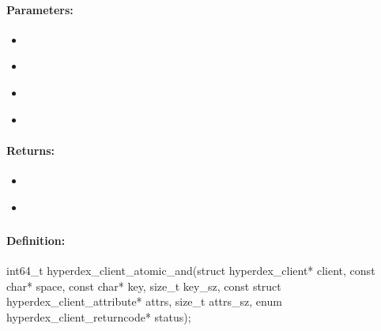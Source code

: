 \paragraph{Parameters:}
\begin{itemize}[noitemsep]
\item {}\\

\item {}\\

\item {}\\

\item {}\\

\end{itemize}

\paragraph{Returns:}
\begin{itemize}[noitemsep]
\item {}\\

\item {}\\

\end{itemize}

\pagebreak
\subsubsection{}
\label{api:c:atomic_and}


\paragraph{Definition:}
\begin{ccode}
int64_t hyperdex_client_atomic_and(struct hyperdex_client* client,
        const char* space,
        const char* key, size_t key_sz,
        const struct hyperdex_client_attribute* attrs, size_t attrs_sz,
        enum hyperdex_client_returncode* status);
\end{ccode}

